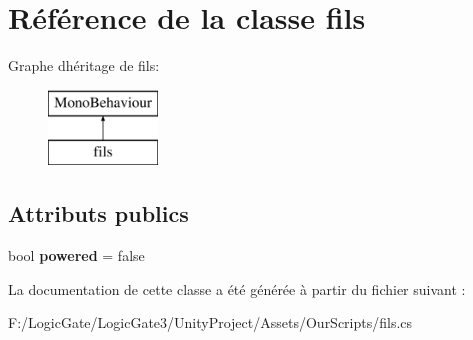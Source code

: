 \hypertarget{classfils}{}\section{Référence de la classe fils}
\label{classfils}
Graphe d\textquotesingle{}héritage de fils\+:\begin{figure}[H]
\begin{center}
\leavevmode
\includegraphics[height=2.000000cm]{classfils}
\end{center}
\end{figure}
\subsection*{Attributs publics}
\begin{DoxyCompactItemize}
\item 
\mbox{\label{classfils_a75fa93b25ebb43aa75d18ec676f5ec38}} 
bool {\bfseries powered} = false
\end{DoxyCompactItemize}


La documentation de cette classe a été générée à partir du fichier suivant \+:\begin{DoxyCompactItemize}
\item 
F\+:/\+Logic\+Gate/\+Logic\+Gate3/\+Unity\+Project/\+Assets/\+Our\+Scripts/fils.\+cs\end{DoxyCompactItemize}
